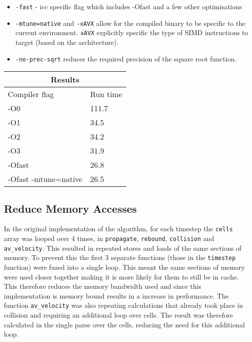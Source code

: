 \documentclass{article}
\begin{document}
\begin{multicols}{2}
\begin{itemize}
  \item \verb|-fast| - icc specific flag which includes -Ofast and a few other
    optimisations
  \item \verb|-mtune=native| and \verb|-xAVX| allow for the compiled binary to
    be specific to the current environment. \verb|xAVX| explicitly specific the 
    type of SIMD instructions to target (based on the architecture).
  \item \verb|-no-prec-sqrt| reduces the required precision of the square root
    function.
\end{itemize}

\begin{center}
 \begin{tabular}{ |p{5cm}||p{1.5cm}| }
 \hline
 \multicolumn{2}{|c|}{Results} \\
 \hline
 Compiler flag & Run time \\
 \hline
 -O0                  & 111.7   \\
 -O1                  & 34.5   \\
 -O2                  & 34.2   \\ 
 -O3                  & 31.9   \\ 
 -Ofast               & 26.8   \\ 
 -Ofast -mtune=native & 26.5   \\
 \hline
\end{tabular}
\label{tab:compilerflags}
\end{center}

\subsection{Reduce Memory Accesses}

In the original implementation of the algorithm, for each timestep the
\verb|cells| array was looped over 4 times, in \verb|propagate|,
\verb|rebound|, \verb|collision| and \verb|av_velocity|. This resulted in
repeated stores and loads of the same sections of memory. To prevent this the
first 3 separate functions (those in the \verb|timestep| function) were fuzed
into a single loop. This meant the same sections of memory were used closer
together making it is more likely for them to still be in cache. This therefore
reduces the memory bandwidth used and since this implementation is memory bound
results in a increase in performance. The function \verb|av_velocity| was also 
repeating calculations that already took place in collision and requiring an
additional loop over cells. The result was therefore calculated in the single
parse over the cells, reducing the need for this additional loop. 


\end{multicols}
\end{document}

